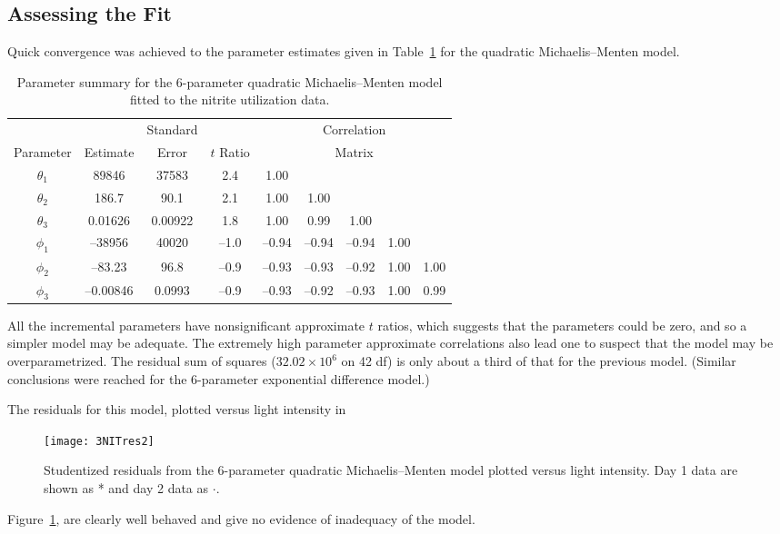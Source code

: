 \subsection{Assessing the Fit}

Quick convergence was achieved
to the parameter estimates given in
Table~\ref{tbl:3.5} for the quadratic Michaelis--Menten model.
\begin{table}
  \caption{
  Parameter summary for the 6-parameter quadratic Michaelis--Menten model
  fitted to the nitrite utilization data.}\label{tbl:3.5}
  \begin{center}
    \begin{tabular}{ccccccccc}\hline
      &&\multicolumn{1}{c}{Standard}&&\multicolumn{5}{c}{Correlation}\\
      \multicolumn{1}{c}{Parameter}&\multicolumn{1}{c}{Estimate}&
      \multicolumn{1}{c}{Error}& \multicolumn{1}{c}{$t$ Ratio} &
      \multicolumn{5}{c}{Matrix}\\ \hline
      $\theta_{1}$&89846&37583&2.4&1.00\\
      $\theta_{2}$&186.7&90.1&2.1&1.00&1.00\\
      $\theta_{3}$&0.01626&0.00922&1.8&1.00&0.99&1.00\\
      $\phi_{1}$&--38956&40020&--1.0&--\/0.94&--\/0.94&--\/0.94&1.00\\
      $\phi_{2}$&--83.23&96.8&--\/0.9&--\/0.93&--\/0.93&--\/0.92&1.00&1.00\\
      $\phi_{3}$&--\/0.00846&0.0993&--\/0.9&--\/0.93&--\/0.92&--\/0.93&1.00&0.99\\ \hline
    \end{tabular}
  \end{center}
\end{table}
All the incremental parameters have nonsignificant approximate
$t$ ratios, which suggests that the parameters could be zero, and
so a simpler model may be adequate.
The extremely high parameter approximate correlations also lead one to
suspect that the model may be overparametrized.
The residual sum of squares ($32.02 \times 10^{6}$ on 42 df)
is only about a third of that for the previous model.
(Similar conclusions were reached for the 6-parameter exponential
difference model.)

The residuals for this model, plotted versus light intensity in
\begin{figure}
  \centerline{\texttt{[image: 3NITres2]}}%
  \caption{Studentized residuals from the 6-parameter quadratic
    Michaelis--Menten model plotted versus light intensity.  Day 1
    data are shown as * and day 2 data as $\cdot$.}
  \label{fig:NITres2}
\end{figure}
Figure~\ref{fig:NITres2}, are clearly well behaved and give no
evidence of inadequacy of the model.


